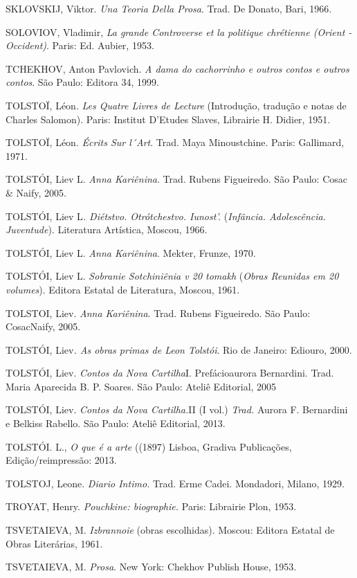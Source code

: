 SKLOVSKIJ, Viktor. \emph{Una Teoria Della Prosa}. Trad. De Donato,
Bari, 1966.

SOLOVIOV, Vladimir, \emph{La grande Controverse et la politique
chrétienne (Orient -Occident)}. Paris: Ed. Aubier, 1953.

TCHEKHOV, Anton Pavlovich. \emph{A dama do cachorrinho e outros contos e
outros contos}. São Paulo: Editora 34, 1999.

TOLSTOÏ, Léon. \emph{Les Quatre Livres de Lecture} (Introdução,
tradução e notas de Charles Salomon). Paris: Institut D'Etudes Slaves,
Librairie H. Didier, 1951.

TOLSTOÏ, Léon. \emph{Écrits Sur l´Art}. Trad. Maya Minoustchine. Paris:
Gallimard, 1971.

TOLSTÓI, Liev L. \emph{Anna Kariênina}. Trad. Rubens Figueiredo. São
Paulo: Cosac \& Naify, 2005.

TOLSTÓI, Liev L\emph{. Diétstvo. Otrótchestvo.
Iunost'.} (\emph{Infância. Adolescência. Juventude}). Literatura
Artística, Moscou, 1966.

TOLSTÓI, Liev L. \emph{Anna Kariênina}. Mekter, Frunze, 1970.

TOLSTÓI, Liev L. \emph{Sobranie Sotchiniênia v 20 tomakh} (\emph{Obras
Reunidas em 20 volumes}). Editora Estatal de Literatura, Moscou, 1961.

TOLSTOI, Liev. \emph{Anna Kariênina}. Trad. Rubens Figueiredo. São
Paulo: CosacNaify, 2005.

TOLSTÓI, Liev\emph{. As obras primas de Leon Tolstói}. Rio de Janeiro:
Ediouro, 2000.

TOLSTÓI, Liev. \emph{Contos da Nova Cartilha}I. Prefácioaurora
Bernardini. Trad. Maria Aparecida B. P. Soares. São Paulo: Ateliê
Editorial, 2005

TOLSTÓI, Liev. \emph{Contos da Nova Cartilha.}II (I vol.) \emph{Trad.}
Aurora F. Bernardini e Belkiss Rabello. São Paulo: Ateliê Editorial,
2013.

TOLSTÓI. L., \emph{O que é a arte} ((1897) Lisboa, Gradiva Publicações,
Edição/reimpressão: 2013.

TOLSTOJ, Leone. \emph{Diario Intimo.} Trad. Erme Cadei. Mondadori,
Milano, 1929.

TROYAT, Henry. \emph{Pouchkine: biographie.} Paris: Librairie Plon,
1953.

TSVETAIEVA, M. \emph{Izbrannoie} (obras escolhidas). Moscou: Editora
Estatal de Obras Literárias, 1961.

TSVETAIEVA, M. \emph{Prosa}. New York: Chekhov Publish House, 1953.

